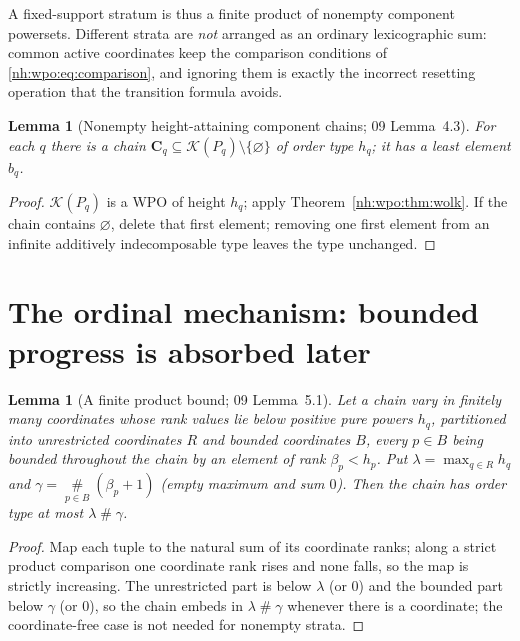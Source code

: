\documentclass[11pt,a4paper]{article}
\newtheorem{lemma}[theorem]{Lemma}
\theoremstyle{definition}
\theoremstyle{remark}
\newcommand{\K}{\mathcal K}
\newcommand{\ns}{\mathbin{\#}}
\newcommand{\bigns}{\mathop{\#}\limits}
\begin{document}
A fixed-support stratum is thus a finite product of nonempty component
powersets. Different strata are \emph{not} arranged as an ordinary
lexicographic sum: common active coordinates keep the comparison conditions of
\eqref{nh:wpo:eq:comparison}, and ignoring them is exactly the incorrect
resetting operation that the transition formula avoids.

\begin{lemma}[Nonempty height-attaining component chains; 09 Lemma~4.3]
\label{nh:wpo:lem:componentchains}
For each $q$ there is a chain $\mathbf C_q\subseteq\K(P_q)\setminus\{\varnothing\}$
of order type $h_q$; it has a least element $b_q$.
\end{lemma}
\begin{proof}
$\K(P_q)$ is a WPO of height $h_q$; apply Theorem~\ref{nh:wpo:thm:wolk}. If the
chain contains $\varnothing$, delete that first element; removing one first
element from an infinite additively indecomposable type leaves the type
unchanged.
\end{proof}

\section{The ordinal mechanism: bounded progress is absorbed later}
\label{nh:wpo:sec:absorption}

\begin{lemma}[A finite product bound; 09 Lemma~5.1]\label{nh:wpo:lem:productbound}
Let a chain vary in finitely many coordinates whose rank values lie below
positive pure powers $h_q$, partitioned into unrestricted coordinates $R$ and
bounded coordinates $B$, every $p\in B$ being bounded throughout the chain by an
element of rank $\beta_p<h_p$. Put $\lambda=\max_{q\in R}h_q$ and
$\gamma=\bigns_{p\in B}(\beta_p+1)$ (empty maximum and sum $0$). Then the chain
has order type at most $\lambda\ns\gamma$.
\end{lemma}
\begin{proof}
Map each tuple to the natural sum of its coordinate ranks; along a strict product
comparison one coordinate rank rises and none falls, so the map is strictly
increasing. The unrestricted part is below $\lambda$ (or $0$) and the bounded
part below $\gamma$ (or $0$), so the chain embeds in $\lambda\ns\gamma$ whenever
there is a coordinate; the coordinate-free case is not needed for nonempty
strata.
\end{proof}
\end{document}
